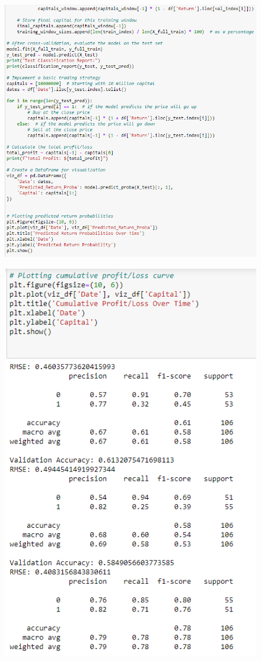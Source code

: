 \begin{figure}[H]
\centering
\includegraphics[scale=0.75]{fig19.jpg}

\end{figure}

\begin{figure}[H]
\centering
\includegraphics[scale=0.65]{fig20.jpg}
\end{figure}

